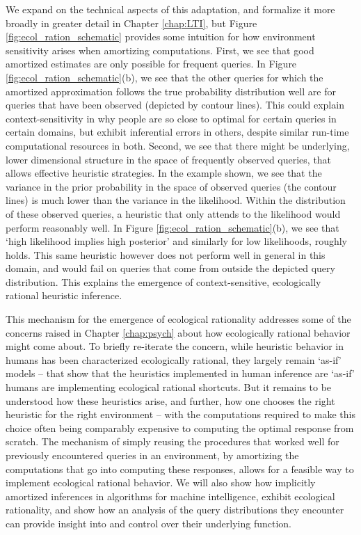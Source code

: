 We expand on the technical aspects of this adaptation, and formalize it more broadly in greater detail in Chapter \ref{chap:LTI}, but Figure \ref{fig:ecol_ration_schematic} provides some intuition for how environment sensitivity arises when amortizing computations. First, we see that good amortized estimates are only possible for frequent queries. In Figure \ref{fig:ecol_ration_schematic}(b), we see that the other queries for which the amortized approximation follows the true probability distribution well are for queries that have been observed (depicted by contour lines). This could explain context-sensitivity in why people are so close to optimal for certain queries in certain domains, but exhibit inferential errors in others, despite similar run-time computational resources in both. Second, we see that there might be underlying, lower dimensional structure in the space of frequently observed queries, that allows effective heuristic strategies. In the example shown, we see that the variance in the prior probability in the space of observed queries (the contour lines) is much lower than the variance in the likelihood. Within the distribution of these observed queries, a heuristic that only attends to the likelihood would perform reasonably well. In Figure \ref{fig:ecol_ration_schematic}(b), we see that `high likelihood implies high posterior' and similarly for low likelihoods, roughly holds. This same heuristic however does not perform well in general in this domain, and would fail on queries that come from outside the depicted query distribution. This explains the emergence of context-sensitive, ecologically rational heuristic inference.

This mechanism for the emergence of ecological rationality addresses some of the concerns raised in Chapter \ref{chap:psych} about how ecologically rational behavior might come about. To briefly re-iterate the concern, while heuristic behavior in humans has been characterized ecologically rational\cite{gigerenzer2008heuristics}, they largely remain `as-if' models -- that show that the heuristics implemented in human inference are `as-if' humans are implementing ecological rational shortcuts. But it remains to be understood how these heuristics arise, and further, how one chooses the right heuristic for the right environment -- with the computations required to make this choice often being comparably expensive to computing the optimal response from scratch\cite{hay2014selecting, horvitz1989reflection}. The mechanism of simply reusing the procedures that worked well for previously encountered queries in an environment, by amortizing the computations that go into computing these responses, allows for a feasible way to implement ecological rational behavior. We will also show how implicitly amortized inferences in algorithms for machine intelligence, exhibit ecological rationality, and show how an analysis of the query distributions they encounter can provide insight into and control over their underlying function.

